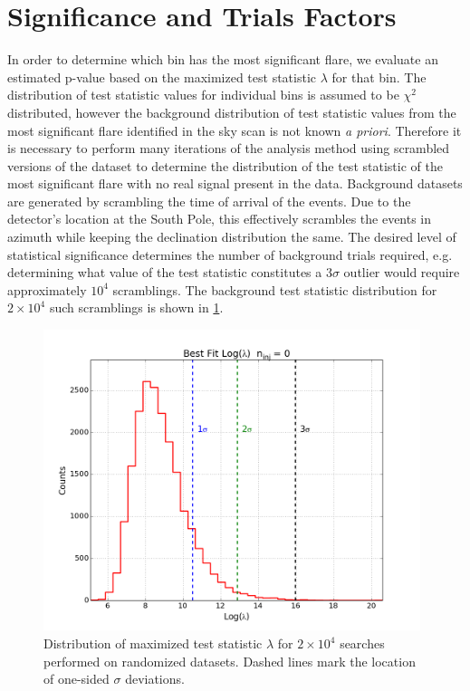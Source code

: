 \documentclass{gatech-thesis}
\begin{document}
\section{Significance and Trials Factors}
In order to determine which bin has the most significant flare, we evaluate an estimated p-value based on the maximized test statistic $\lambda$ for that bin. The distribution of test statistic values for individual bins is assumed to be $\chi^2$ distributed, however the background distribution of test statistic values from the most significant flare identified in the sky scan is not known \textit{a priori}. Therefore it is necessary to perform many iterations of the analysis method using scrambled versions of the dataset to determine the distribution of the test statistic of the most significant flare with no real signal present in the data. Background datasets are generated by scrambling the time of arrival of the events. Due to the detector's location at the South Pole, this effectively scrambles the events in azimuth while keeping the declination distribution the same. The desired level of statistical significance determines the number of background trials required, e.g. determining what value of the test statistic constitutes a 3$\sigma$ outlier would require approximately $10^4$ scramblings. The background test statistic distribution for $2\times 10^4$ such scramblings is shown in \ref{fig:NullScramblingDistribution}.

\begin{figure}[ht]
  \begin{center}
    \includegraphics[width=0.98\textwidth,keepaspectratio]{TestStatisticDistribution_Null.png}
  \end{center}
  \caption[Background Test Statistic Distribution]{Distribution of maximized test statistic $\lambda$ for $2\times 10^4$ searches performed on randomized datasets. Dashed lines mark the location of one-sided $\sigma$ deviations.}
  \label{fig:NullScramblingDistribution}
\end{figure}
\end{document}
